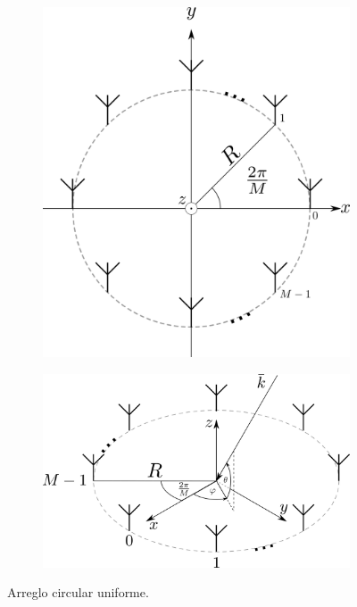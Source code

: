 \begin{figure}
    \centering
    \begin{subfigure}[b]{0.7\textwidth}
        \centering
        \includegraphics[width=\linewidth]{images/02-Beamforming/uca.png}
    \end{subfigure}
    \hfill
    \begin{subfigure}[b]{0.7\textwidth}
        \centering
        \includegraphics[width=\linewidth]{images/02-Beamforming/uca_3d.png}
    \end{subfigure}
    \caption{Arreglo circular uniforme.}
    \label{fig:beamforming_uca}
\end{figure}


